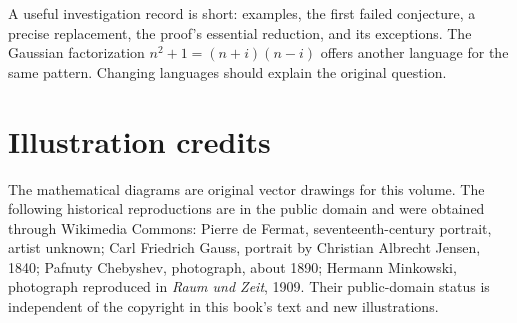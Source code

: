 A useful investigation record is short: examples, the first failed
conjecture, a precise replacement, the proof's essential reduction,
and its exceptions. The Gaussian factorization
$n^2+1=(n+i)(n-i)$ offers another language for the same pattern.
Changing languages should explain the original question.

\section*{Illustration credits}
The mathematical diagrams are original vector drawings for this volume. The following historical reproductions
are in the public domain and were obtained through Wikimedia Commons: Pierre de Fermat, seventeenth-century
portrait, artist unknown; Carl Friedrich Gauss, portrait by Christian Albrecht Jensen, 1840; Pafnuty Chebyshev,
photograph, about 1890; Hermann Minkowski, photograph reproduced in \emph{Raum und Zeit}, 1909.
Their public-domain status is independent of the copyright in this book's text and new illustrations.
